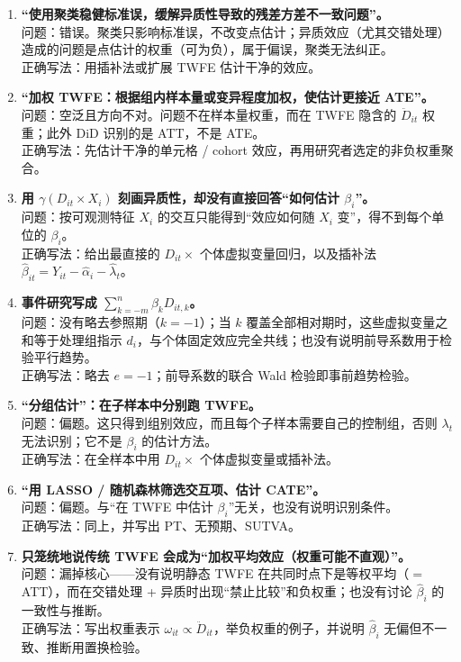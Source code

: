 \begin{note}[第 2(b) 题的常见错误]
\begin{enumerate}
  \item \textbf{“使用聚类稳健标准误，缓解异质性导致的残差方差不一致问题”。}\\
  问题：错误。聚类只影响标准误，不改变点估计；异质效应（尤其交错处理）造成的问题是点估计的权重（可为负），属于偏误，聚类无法纠正。\\
  正确写法：用插补法或扩展 TWFE 估计干净的效应。
  \item \textbf{“加权 TWFE：根据组内样本量或变异程度加权，使估计更接近 ATE”。}\\
  问题：空泛且方向不对。问题不在样本量权重，而在 TWFE 隐含的 $\ddot D_{it}$ 权重；此外 DiD 识别的是 ATT，不是 ATE。\\
  正确写法：先估计干净的单元格 / cohort 效应，再用研究者选定的非负权重聚合。
  \item \textbf{用 $\gamma(D_{it}\times X_i)$ 刻画异质性，却没有直接回答“如何估计 $\beta_i$”。}\\
  问题：按可观测特征 $X_i$ 的交互只能得到“效应如何随 $X_i$ 变”，得不到每个单位的 $\beta_i$。\\
  正确写法：给出最直接的 $D_{it}\times$ 个体虚拟变量回归，以及插补法 $\hat\beta_{it}=Y_{it}-\hat\alpha_i-\hat\lambda_t$。
  \item \textbf{事件研究写成 $\sum_{k=-m}^{n}\beta_kD_{it,k}$。}\\
  问题：没有略去参照期（$k=-1$）；当 $k$ 覆盖全部相对期时，这些虚拟变量之和等于处理组指示 $d_i$，与个体固定效应完全共线；也没有说明前导系数用于检验平行趋势。\\
  正确写法：略去 $e=-1$；前导系数的联合 Wald 检验即事前趋势检验。
  \item \textbf{“分组估计”：在子样本中分别跑 TWFE。}\\
  问题：偏题。这只得到组别效应，而且每个子样本需要自己的控制组，否则 $\lambda_t$ 无法识别；它不是 $\beta_i$ 的估计方法。\\
  正确写法：在全样本中用 $D_{it}\times$ 个体虚拟变量或插补法。
  \item \textbf{“用 LASSO / 随机森林筛选交互项、估计 CATE”。}\\
  问题：偏题。与“在 TWFE 中估计 $\beta_i$”无关，也没有说明识别条件。\\
  正确写法：同上，并写出 PT、无预期、SUTVA。
  \item \textbf{只笼统地说传统 TWFE 会成为“加权平均效应（权重可能不直观）”。}\\
  问题：漏掉核心——没有说明静态 TWFE 在共同时点下是等权平均（$=$ATT），而在交错处理 + 异质时出现“禁止比较”和负权重；也没有讨论 $\hat\beta_i$ 的一致性与推断。\\
  正确写法：写出权重表示 $\omega_{it}\propto\ddot D_{it}$，举负权重的例子，并说明 $\hat\beta_i$ 无偏但不一致、推断用置换检验。
\end{enumerate}
\end{note}

